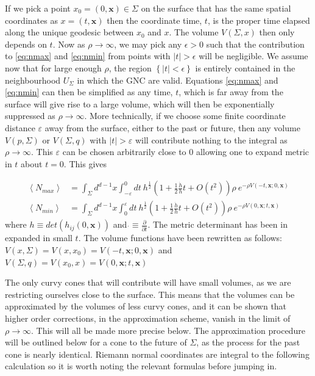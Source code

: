 \documentclass[12pt]{article}
\begin{document}
If we pick a point $x_0=(0,\mathbf{x})\in \Sigma$ on the surface that has the same spatial coordinates as $x=(t,\mathbf{x})$ then the coordinate time, $t$, is the proper time elapsed along the unique geodesic between $x_0$ and $x$. The volume $V(\Sigma,x)$ then only depends on $t$. Now as $\rho\rightarrow\infty$, we may pick any $\epsilon>0$ such that the contribution to \eqref{eq:nmax} and \eqref{eq:nmin} from points with $|t|>\epsilon$ will be negligible. We assume now that for large enough $\rho$, the region $\left\{|t|<\epsilon\right\}$ is entirely contained in the neighbourhood $U_\Sigma$ in which the GNC are valid.
Equations \eqref{eq:nmax} and \eqref{eq:nmin} can then be simplified as any time, $t$, which is far away from the surface will give rise to a large volume, which will then be exponentially suppressed as $\rho \rightarrow \infty$. More technically, if we choose some finite coordinate distance $\varepsilon$ away from the surface, either to the past or future, then any volume $V(p,\Sigma)$ or $V(\Sigma,q)$ with $|t|>\varepsilon$ will contribute nothing to the integral as $\rho \rightarrow \infty$. This $\varepsilon$ can be chosen arbitrarily close to $0$ allowing one to expand metric in $t$ about $t=0$. This gives

\begin{align}\label{eq:nmax_and_eq:nmin}
\left\langle N_{max}\right\rangle & =\int_{\Sigma}d^{d-1}x\int_{-\varepsilon}^{0}dt\:
h^{\frac{1}{2}}\left(1+
\frac{1}{2}\frac{\dot{h}}{h}t+O(t^2)\right)
 \rho\ e^{-\rho V(-t,\mathbf{x};0,\mathbf{x})}
\\
\left\langle N_{min}\right\rangle & =\int_{\Sigma}d^{d-1}x\int_{0}^{\varepsilon}dt\:
h^{\frac{1}{2}}\left(1+
\frac{1}{2}\frac{\dot{h}}{h}t+O(t^2)\right) \rho\ e^{-\rho V(0,\mathbf{x};t,\mathbf{x})}
\end{align}
where $h\equiv det\left(h_{ij}(0,\mathbf{x})\right)$ and $\dot{}\equiv \frac{\partial}{\partial t}$. The metric determinant has been in expanded in small $t$. The volume functions have been rewritten as follows: $V(x,\Sigma)=V(x,x_0)=V(-t,\mathbf{x};0,\mathbf{x})$ and $V(\Sigma,q)=V(x_0,x)=V(0,\mathbf{x};t,\mathbf{x})$

The only curvy cones that will contribute will have small volumes, as we are restricting ourselves close to the surface. This means that the volumes can be approximated by the volumes of less curvy cones, and it can be shown that higher order corrections, in the approximation scheme, vanish in the limit of $\rho \rightarrow \infty$. This will all be made more precise below. The approximation procedure will be outlined below for a cone to the future of $\Sigma$, as the process for the past cone is nearly identical. Riemann normal coordinates are integral to the following calculation so it is worth noting the relevant formulas before jumping in. 
\end{document}
